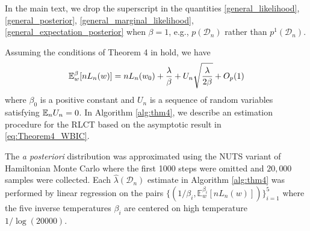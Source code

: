 \documentclass{article} %
\begin{document}
In the main text, we drop the superscript in the quantities \ref{general_likelihood}, \ref{general_posterior}, \ref{general_marginal_likelihood}, \ref{general_expectation_posterior} when $\beta = 1$, e.g., $p(\mathcal D_n)$ rather than $p^1(\mathcal D_n)$.


Assuming the conditions of Theorem 4 in \cite{watanabe_widely_2013} hold, we have
\begin{equation}
    {\mathbb{E}}_w^\beta [nL_n(w)] = nL_n(w_0) + \frac{\lambda }{\beta} + U_n \sqrt{\frac{\lambda}{2 \beta}} + O_p(1)
    \label{eq:Theorem4_WBIC}
\end{equation}
where $\beta_0$ is a positive constant and $U_n$ is a sequence of random variables satisfying ${\mathbb{E}}_n U_n = 0$. %
In Algorithm \ref{alg:thm4}, we describe an estimation procedure for the RLCT based on the asymptotic result in \eqref{eq:Theorem4_WBIC}.

The \emph{a posteriori} distribution was approximated using the NUTS variant of Hamiltonian Monte Carlo \citep{hoffman2014no} where the first 1000 steps were omitted and $20,000$ samples were collected.  Each $\hat \lambda(\mathcal D_n)$ estimate in Algorithm \ref{alg:thm4} was performed by linear regression on the pairs $\{ (1/\beta_i, \mathbb{E}^{\beta_i}_w[ nL_n(w) ] ) \}_{i=1}^5$ where the five inverse temperatures $\beta_i$ are centered on high temperature $1/\log(20000)$.
\end{document}
